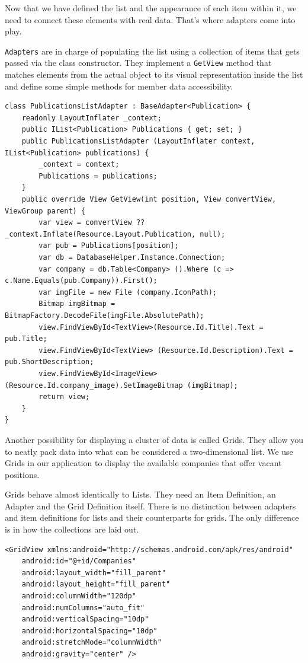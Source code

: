 Now that we have defined the list and the appearance of each item within it, we need to connect these elements with real data. That's where adapters come into play. 

\texttt{Adapters} are in charge of populating the list using a collection of items that gets passed via the class constructor. They implement a \texttt{GetView} method that matches elements from the actual object to its visual representation inside the list and define some simple methods for member data accessibility.

\lstset{language=[Sharp]C}

\begin{lstlisting}[frame=lt,caption=PublicationsListAdapter.cs, label={list:pubList_cs}]
class PublicationsListAdapter : BaseAdapter<Publication> {
	readonly LayoutInflater _context; 
	public IList<Publication> Publications { get; set; }
	public PublicationsListAdapter (LayoutInflater context, IList<Publication> publications) {
		_context = context;
		Publications = publications;		
	}
	public override View GetView(int position, View convertView, ViewGroup parent) {
		var view = convertView ?? _context.Inflate(Resource.Layout.Publication, null);
		var pub = Publications[position];
		var db = DatabaseHelper.Instance.Connection;
		var company = db.Table<Company> ().Where (c => c.Name.Equals(pub.Company)).First();
		var imgFile = new File (company.IconPath);
		Bitmap imgBitmap = BitmapFactory.DecodeFile(imgFile.AbsolutePath);
		view.FindViewById<TextView>(Resource.Id.Title).Text = pub.Title; 
		view.FindViewById<TextView> (Resource.Id.Description).Text = pub.ShortDescription;
		view.FindViewById<ImageView> (Resource.Id.company_image).SetImageBitmap (imgBitmap);
		return view; 
	}
}
\end{lstlisting}

Another possibility for displaying a cluster of data is called Grids. They allow you to neatly pack data into what can be considered a two-dimensional list. We use Grids in our application to display the available companies that offer vacant positions.

Grids behave almost identically to Lists. They need an Item Definition, an Adapter and the Grid Definition itself. There is no distinction between adapters and item definitions for lists and their counterparts for grids. The only difference is in how the collections are laid out.

\lstset{language=XML}
\begin{lstlisting}[frame=lt,caption=CompaniesGrid.axml, label={list:grid_xml}]
<GridView xmlns:android="http://schemas.android.com/apk/res/android"
    android:id="@+id/Companies"
    android:layout_width="fill_parent"
    android:layout_height="fill_parent"
    android:columnWidth="120dp"
    android:numColumns="auto_fit"
    android:verticalSpacing="10dp"
    android:horizontalSpacing="10dp"
    android:stretchMode="columnWidth"
    android:gravity="center" />
\end{lstlisting}

